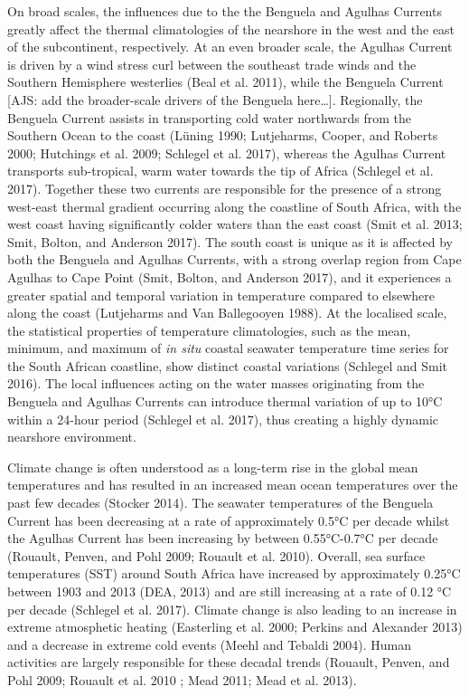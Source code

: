 \documentclass[12pt,a4paper,]{article}
\begin{document}
On broad scales, the influences due to the the Benguela and Agulhas
Currents greatly affect the thermal climatologies of the nearshore in
the west and the east of the subcontinent, respectively. At an even
broader scale, the Agulhas Current is driven by a wind stress curl
between the southeast trade winds and the Southern Hemisphere westerlies
(Beal et al. 2011), while the Benguela Current {[}AJS: add the
broader-scale drivers of the Benguela here\ldots{}{]}. Regionally, the
Benguela Current assists in transporting cold water northwards from the
Southern Ocean to the coast (Lüning 1990; Lutjeharms, Cooper, and
Roberts 2000; Hutchings et al. 2009; Schlegel et al. 2017), whereas the
Agulhas Current transports sub-tropical, warm water towards the tip of
Africa (Schlegel et al. 2017). Together these two currents are
responsible for the presence of a strong west-east thermal gradient
occurring along the coastline of South Africa, with the west coast
having significantly colder waters than the east coast (Smit et al.
2013; Smit, Bolton, and Anderson 2017). The south coast is unique as it
is affected by both the Benguela and Agulhas Currents, with a strong
overlap region from Cape Agulhas to Cape Point (Smit, Bolton, and
Anderson 2017), and it experiences a greater spatial and temporal
variation in temperature compared to elsewhere along the coast
(Lutjeharms and Van Ballegooyen 1988). At the localised scale, the
statistical properties of temperature climatologies, such as the mean,
minimum, and maximum of \emph{in situ} coastal seawater temperature time
series for the South African coastline, show distinct coastal variations
(Schlegel and Smit 2016). The local influences acting on the water
masses originating from the Benguela and Agulhas Currents can introduce
thermal variation of up to 10°C within a 24-hour period (Schlegel et al.
2017), thus creating a highly dynamic nearshore environment.

Climate change is often understood as a long-term rise in the global
mean temperatures and has resulted in an increased mean ocean
temperatures over the past few decades (Stocker 2014). The seawater
temperatures of the Benguela Current has been decreasing at a rate of
approximately 0.5°C per decade whilst the Agulhas Current has been
increasing by between 0.55°C-0.7°C per decade (Rouault, Penven, and Pohl
2009; Rouault et al. 2010). Overall, sea surface temperatures (SST)
around South Africa have increased by approximately 0.25°C between 1903
and 2013 (DEA, 2013) and are still increasing at a rate of 0.12 °C per
decade (Schlegel et al. 2017). Climate change is also leading to an
increase in extreme atmosphetic heating (Easterling et al. 2000; Perkins
and Alexander 2013) and a decrease in extreme cold events (Meehl and
Tebaldi 2004). Human activities are largely responsible for these
decadal trends (Rouault, Penven, and Pohl 2009; Rouault et al. 2010 ;
Mead 2011; Mead et al. 2013).
\end{document}
